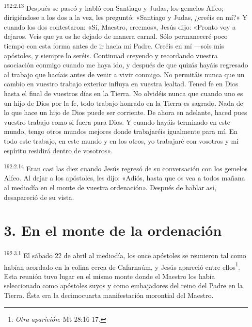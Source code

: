 \par
\textsuperscript{192:2.13} Después se paseó y habló con Santiago y Judas, los gemelos Alfeo; dirigiéndose a los dos a la vez, les preguntó: «Santiago y Judas, ¿creéis en mí?» Y cuando los dos contestaron: «Sí, Maestro, creemos», Jesús dijo: «Pronto voy a dejaros. Veis que ya os he dejado de manera carnal. Sólo permaneceré poco tiempo con esta forma antes de ir hacia mi Padre. Creéis en mí ---sois mis apóstoles, y siempre lo seréis. Continuad creyendo y recordando vuestra asociación conmigo cuando me haya ido, y después de que quizás hayáis regresado al trabajo que hacíais antes de venir a vivir conmigo. No permitáis nunca que un cambio en vuestro trabajo exterior influya en vuestra lealtad. Tened fe en Dios hasta el final de vuestros días en la Tierra. No olvidéis nunca que cuando uno es un hijo de Dios por la fe, todo trabajo honrado en la Tierra es sagrado. Nada de lo que hace un hijo de Dios puede ser corriente. De ahora en adelante, haced pues vuestro trabajo como si fuera para Dios. Y cuando hayáis terminado en este mundo, tengo otros mundos mejores donde trabajaréis igualmente para mí. En todo este trabajo, en este mundo y en los otros, yo trabajaré con vosotros y mi espíritu residirá dentro de vosotros».

\par
\textsuperscript{192:2.14} Eran casi las diez cuando Jesús regresó de su conversación con los gemelos Alfeo. Al dejar a los apóstoles, les dijo: «Adiós, hasta que os vea a todos mañana al mediodía en el monte de vuestra ordenación». Después de hablar así, desapareció de su vista.

\section*{3. En el monte de la ordenación}
\par
\textsuperscript{192:3.1} El sábado 22 de abril al mediodía, los once apóstoles se reunieron tal como habían acordado en la colina cerca de Cafarnaúm, y Jesús apareció entre ellos\footnote{\textit{Otra aparición}: Mt 28:16-17.}. Esta reunión tuvo lugar en el mismo monte donde el Maestro los había seleccionado como apóstoles suyos y como embajadores del reino del Padre en la Tierra. Ésta era la decimocuarta manifestación morontial del Maestro.

